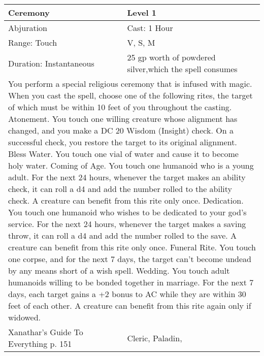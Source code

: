 \documentclass[11pt]{report}
\begin{document}
\begin{table}[H]
	\begin{tabular}{||p{6cm}|p{6cm}||}
		\hline\hline
		\bf{Ceremony} & Level 1\\ \hline
		Abjuration & Cast: 1 Hour\\ \hline
		Range: Touch & V, S, M\\ \hline
		Duration: Instantaneous & 25 gp worth of powdered silver,which the spell consumes\\ \hline
		\multicolumn{2}{||p{12cm}||}{You perform a special religious ceremony that is infused with magic. When you cast the spell, choose one of the following rites, the target of which must be within 10 feet of you throughout the casting.
Atonement. You touch one willing creature whose alignment has changed, and you make a DC 20 Wisdom (Insight) check. On a successful check, you restore the target to its original alignment.
Bless Water. You touch one vial of water and cause it to become holy water.
Coming of Age. You touch one humanoid who is a young adult. For the next 24 hours, whenever the target makes an ability check, it can roll a d4 and add the number rolled to the ability check. A creature can benefit from this rite only once.
Dedication. You touch one humanoid who wishes to be dedicated to your god’s service. For the next 24 hours, whenever the target makes a saving throw, it can roll a d4 and add the number rolled to the save. A creature can benefit from this rite only once.
Funeral Rite. You touch one corpse, and for the next 7 days, the target can’t become undead by any means short of a wish spell.
Wedding. You touch adult humanoids willing to be bonded together in marriage. For the next 7 days, each target gains a +2 bonus to AC while they are within 30 feet of each other. A creature can benefit from this rite again only if widowed.}\\ \hline
Xanathar's Guide To Everything p. 151 & Cleric, Paladin, \\ \hline\hline
	\end{tabular}
\end{table}
\end{document}

